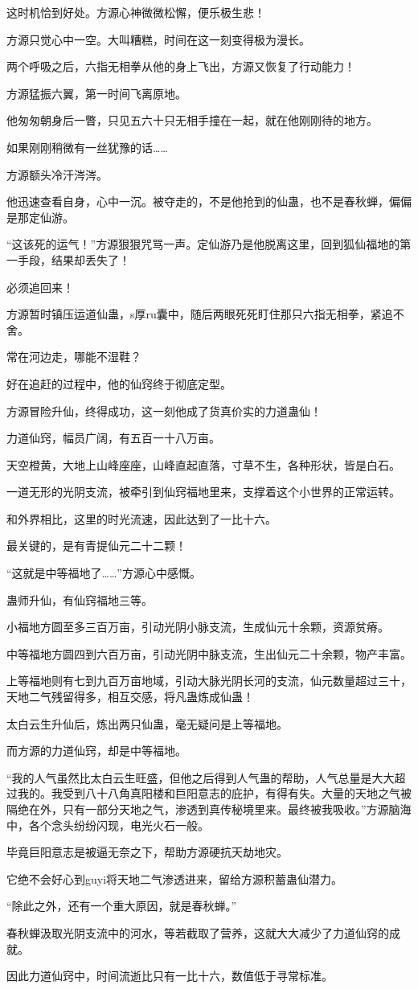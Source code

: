 \begin{this_body}
这时机恰到好处。方源心神微微松懈，便乐极生悲！

方源只觉心中一空。大叫糟糕，时间在这一刻变得极为漫长。

两个呼吸之后，六指无相拳从他的身上飞出，方源又恢复了行动能力！

方源猛振六翼，第一时间飞离原地。

他匆匆朝身后一瞥，只见五六十只无相手撞在一起，就在他刚刚待的地方。

如果刚刚稍微有一丝犹豫的话……

方源额头冷汗涔涔。

他迅速查看自身，心中一沉。被夺走的，不是他抢到的仙蛊，也不是春秋蝉，偏偏是那定仙游。

“这该死的运气！”方源狠狠咒骂一声。定仙游乃是他脱离这里，回到狐仙福地的第一手段，结果却丢失了！

必须追回来！

方源暂时镇压运道仙蛊，s厚ru囊中，随后两眼死死盯住那只六指无相拳，紧追不舍。

常在河边走，哪能不湿鞋？

好在追赶的过程中，他的仙窍终于彻底定型。

方源冒险升仙，终得成功，这一刻他成了货真价实的力道蛊仙！

力道仙窍，幅员广阔，有五百一十八万亩。

天空橙黄，大地上山峰座座，山峰直起直落，寸草不生，各种形状，皆是白石。

一道无形的光阴支流，被牵引到仙窍福地里来，支撑着这个小世界的正常运转。

和外界相比，这里的时光流速，因此达到了一比十六。

最关键的，是有青提仙元二十二颗！

“这就是中等福地了……”方源心中感慨。

蛊师升仙，有仙窍福地三等。

小福地方圆至多三百万亩，引动光阴小脉支流，生成仙元十余颗，资源贫瘠。

中等福地方圆四到六百万亩，引动光阴中脉支流，生出仙元二十余颗，物产丰富。

上等福地则有七到九百万亩地域，引动大脉光阴长河的支流，仙元数量超过三十，天地二气残留得多，相互交感，将凡蛊炼成仙蛊！

太白云生升仙后，炼出两只仙蛊，毫无疑问是上等福地。

而方源的力道仙窍，却是中等福地。

“我的人气虽然比太白云生旺盛，但他之后得到人气蛊的帮助，人气总量是大大超过我的。我受到八十八角真阳楼和巨阳意志的庇护，有得有失。大量的天地之气被隔绝在外，只有一部分天地之气，渗透到真传秘境里来。最终被我吸收。”方源脑海中，各个念头纷纷闪现，电光火石一般。

毕竟巨阳意志是被逼无奈之下，帮助方源硬抗天劫地灾。

它绝不会好心到guyi将天地二气渗透进来，留给方源积蓄蛊仙潜力。

“除此之外，还有一个重大原因，就是春秋蝉。”

春秋蝉汲取光阴支流中的河水，等若截取了营养，这就大大减少了力道仙窍的成就。

因此力道仙窍中，时间流逝比只有一比十六，数值低于寻常标准。

\end{this_body}

